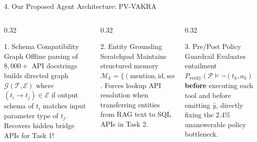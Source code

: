 \documentclass[aspectratio=169, 10pt]{beamer}
\begin{document}
\begin{frame}{4. Our Proposed Agent Architecture: PV-VAKRA}
\begin{center}
\end{center}
\vspace{-0.15cm}
\begin{columns}[T, onlytextwidth]
\begin{column}{0.32\textwidth}
\begin{block}{\footnotesize 1. Schema Compatibility Graph}
\scriptsize
Offline parsing of $8,000+$ API docstrings builds directed graph $\mathcal{G}(\mathcal{T}, \mathcal{E})$ where $(t_i \rightarrow t_j) \in \mathcal{E}$ if output schema of $t_i$ matches input parameter type of $t_j$. Recovers hidden bridge APIs for Task 1!
\end{block}
\end{column}
\begin{column}{0.32\textwidth}
\begin{block}{\footnotesize 2. Entity Grounding Scratchpad}
\scriptsize
Maintains structured memory $\mathcal{M}_k = \{(\text{mention}, \text{id}, \text{source}, \text{type})\}$. Forces lookup API resolution when transferring entities from RAG text to SQL APIs in Task 2.
\end{block}
\end{column}
\begin{column}{0.32\textwidth}
\begin{alertblock}{\footnotesize 3. Pre/Post Policy Guardrail}
\scriptsize
Evaluates entailment $P_{\text{verify}}(\mathcal{P} \models \neg(t_k, a_k))$ \textbf{before} executing each tool and before emitting $\hat{y}$, directly fixing the $2.4\%$ unanswerable policy bottleneck.
\end{alertblock}
\end{column}
\end{columns}
\end{frame}
\end{document}
